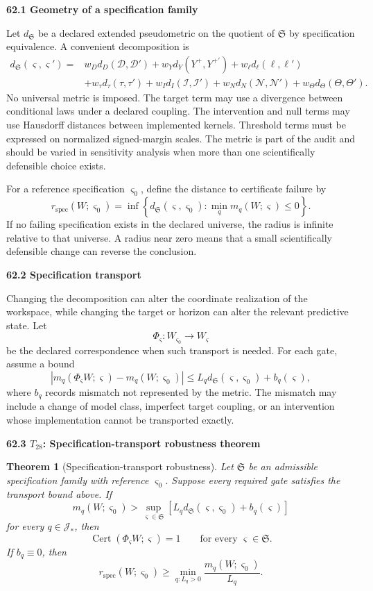 \documentclass[11pt,letterpaper]{article}
\newcommand{\subtopic}[1]{%
 \vspace{0.45em}
 {\bfseries\color{AccentColor} #1\par}
}
\theoremstyle{plain}
\newtheorem{theorem}{Theorem}
\theoremstyle{definition}
\begin{document}
\subtopic{62.1 Geometry of a specification family}

Let \(d_{\mathfrak S}\) be a declared extended pseudometric on the quotient of
\(\mathfrak S\) by specification equivalence. A convenient decomposition is
\[
\begin{aligned}
d_{\mathfrak S}(\varsigma,\varsigma')
={}&
 w_Dd_D(\mathcal D,\mathcal D')
+w_Yd_Y(Y^+,Y^{+'})
+w_\ell d_\ell(\ell,\ell')\\
&+w_\tau d_\tau(\tau,\tau')
+w_Id_I(\mathcal I,\mathcal I')
+w_Nd_N(\mathcal N,\mathcal N')
+w_\Theta d_\Theta(\Theta,\Theta').
\end{aligned}
\]
No universal metric is imposed. The target term may use a divergence between
conditional laws under a declared coupling. The intervention and null terms
may use Hausdorff distances between implemented kernels. Threshold terms must
be expressed on normalized signed-margin scales. The metric is part of the
audit and should be varied in sensitivity analysis when more than one
scientifically defensible choice exists.

For a reference specification \(\varsigma_0\), define the distance to
certificate failure by
\[
\boxed{
r_{\mathrm{spec}}(W;\varsigma_0)
=
\inf\left\{
 d_{\mathfrak S}(\varsigma,\varsigma_0):
 \min_q m_q(W;\varsigma)\leq0
\right\}.
}
\]
If no failing specification exists in the declared universe, the radius is
infinite relative to that universe. A radius near zero means that a small
scientifically defensible change can reverse the conclusion.

\subtopic{62.2 Specification transport}

Changing the decomposition can alter the coordinate realization of the
workspace, while changing the target or horizon can alter the relevant
predictive state. Let
\[
\Phi_{\varsigma}:W_{\varsigma_0}\longrightarrow W_{\varsigma}
\]
be the declared correspondence when such transport is needed. For each gate,
assume a bound
\[
\left|
 m_q(\Phi_{\varsigma}W;\varsigma)
 -m_q(W;\varsigma_0)
\right|
\leq
L_qd_{\mathfrak S}(\varsigma,\varsigma_0)
+b_q(\varsigma),
\]
where \(b_q\) records mismatch not represented by the metric. The mismatch may
include a change of model class, imperfect target coupling, or an intervention
whose implementation cannot be transported exactly.

\subtopic{62.3 \(T_{28}\): Specification-transport robustness theorem}

\begin{theorem}[Specification-transport robustness]
\label{thm:specification-transport}
Let \(\mathfrak S\) be an admissible specification family with reference
\(\varsigma_0\). Suppose every required gate satisfies the transport bound
above. If
\[
\boxed{
 m_q(W;\varsigma_0)
>
\sup_{\varsigma\in\mathfrak S}
\left[
L_qd_{\mathfrak S}(\varsigma,\varsigma_0)
+b_q(\varsigma)
\right]
}
\]
for every \(q\in\mathcal J_*\), then
\[
\operatorname{Cert}(\Phi_{\varsigma}W;\varsigma)=1
\qquad
\text{for every }\varsigma\in\mathfrak S.
\]
If \(b_q\equiv0\), then
\[
\boxed{
r_{\mathrm{spec}}(W;\varsigma_0)
\geq
\min_{q:L_q>0}
\frac{m_q(W;\varsigma_0)}{L_q}.
}
\]
\end{theorem}
\end{document}
